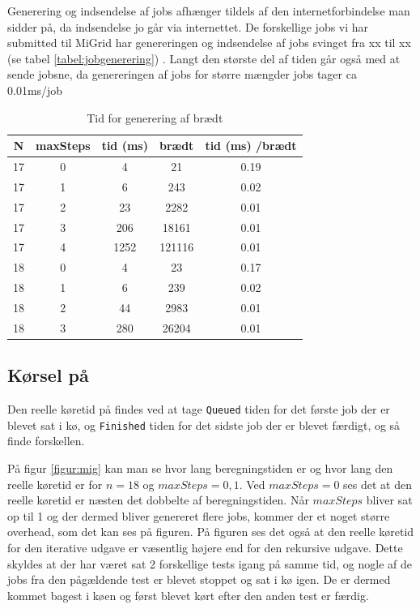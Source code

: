 Generering og indsendelse af jobs afhænger tildels af den internetforbindelse
man sidder på, da indsendelse jo går via internettet. De forskellige jobs vi har
submitted til MiGrid har genereringen og indsendelse af jobs svinget fra xx til
xx (se tabel \ref{tabel:jobgenerering}) . Langt den største del af tiden går også med at sende jobsne,
da genereringen af jobs for større mængder jobs tager ca 0.01ms/job
\begin{table}
\begin{center}
\begin{tabular}{|c|c|c|c|c|}
\hline N & maxSteps & tid (ms) & brædt & tid (ms) /brædt \\
\hline 17 & 0 & 4 & 21 & 0.19 \\
\hline 17 & 1 & 6 & 243 & 0.02 \\
\hline 17 & 2 & 23 & 2282 & 0.01 \\
\hline 17 & 3 & 206 & 18161 & 0.01 \\
\hline 17 & 4 & 1252 & 121116 & 0.01 \\
\hline 18 & 0 & 4 & 23 & 0.17 \\
\hline 18 & 1 & 6 & 239 & 0.02 \\
\hline 18 & 2 & 44 & 2983 & 0.01 \\
\hline 18 & 3 & 280 & 26204 & 0.01 \\
\hline
\end{tabular}
\caption{Tid for generering af brædt}
\label{table:boardgenering}
\end{center}
\end{table}

\subsection{Kørsel på \mig}

Den reelle køretid på \mig findes ved at tage \texttt{Queued} tiden for det første job der er
blevet sat i kø, og \texttt{Finished} tiden for det sidste job der er blevet
færdigt, og så finde forskellen.

På figur \ref{figur:mig} kan man se hvor lang beregningstiden er og hvor lang
den reelle køretid er for $n=18$ og $maxSteps=0,1$. Ved $maxSteps=0$ ses det at
den reelle køretid er næsten det dobbelte af beregningstiden. Når $maxSteps$
bliver sat op til 1 og der dermed bliver genereret flere jobs, kommer der et
noget større overhead, som det kan ses på figuren. På figuren ses det også at
den reelle køretid for den iterative udgave er væsentlig højere end for den
rekursive udgave. Dette skyldes at der har været sat 2 forskellige tests igang
på samme tid, og nogle af de jobs fra den pågældende test er blevet stoppet og
sat i kø igen. De er dermed kommet bagest i køen og først blevet kørt efter den
anden test er færdig. 

